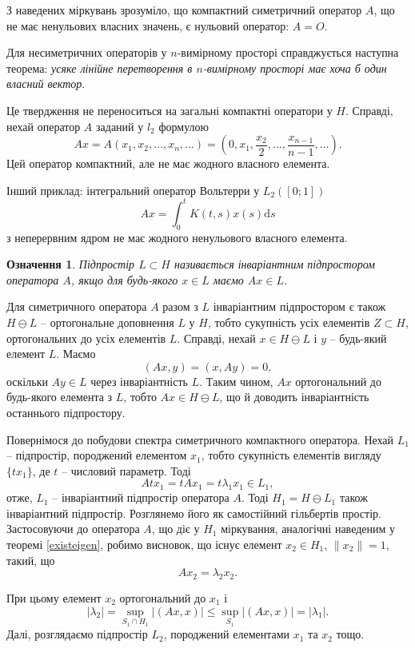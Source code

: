\documentclass[14pt,twoside]{extreport}
\theoremstyle{mystyle}
\newtheorem{dfn}{Означення}
\numberwithin{equation}{chapter}
\begin{document}
З наведених міркувань зрозуміло, що компактний симетричний оператор $A$, що не має ненульових власних значень, є нульовий оператор: $A = O$.

Для несиметричних операторів у $n$-вимірному просторі справджується наступна теорема: \emph{усяке лінійне перетворення в $n$-вимірному просторі має хоча б один власний вектор}.

Це твердження не переноситься на загальні компактні оператори у $H$. Справді, нехай оператор $A$ заданий у $l_2$ формулою
\[
 Ax=A(x_1, x_2, \ldots, x_n, \ldots) = \left(0, x_1, \frac{x_2}{2}, \dots, \frac{x_{n-1}}{n-1}, \dots\right).
\]
Цей оператор компактний, але не має жодного власного елемента.

Інший приклад: інтегральний оператор Вольтерри у $L_2([0; 1])$
\[
 Ax=\int_{0}^{t} K(t, s) x(s) \mathrm{d}s
\]
з неперервним ядром не має жодного ненульового власного елемента.

\begin{dfn}
Підпростір $L \subset H$ називається інваріантним підпростором оператора $A$, якщо для будь-якого $x \in L$ маємо $Ax \in L$.
\end{dfn}

Для симетричного оператора $A$ разом з $L$ інваріантним підпростором є також $H \ominus L$ -- ортогональне доповнення $L$ у $H$, тобто сукупність усіх елементів $Z \subset H$, ортогональних до усіх елементів $L$. Справді, нехай $x \in H \ominus L$ і $y$ -- будь-який елемент $L$. Маємо
\[
 (Ax, y) = (x, Ay) = 0,
\]
оскільки $Ay \in L$ через інваріантність $L$. Таким чином, $Ax$ ортогональний до будь-якого елемента з $L$, тобто $Ax \in H \ominus L$, що й доводить інваріантність останнього підпростору.

Повернімося до побудови спектра симетричного компактного оператора. Нехай $L_1$ -- підпростір, породжений елементом $x_1$, тобто сукупність елементів вигляду $\{tx_1\}$, де $t$ -- числовий параметр. Тоді
\[
 Atx_1 = tAx_1 = t\lambda_1 x_1 \in L_1,
\]
отже, $L_1$ -- інваріантний підпростір оператора $A$. Тоді $H_1 = H \ominus L_1$ також інваріантний підпростір. Розглянемо його як самостійний гільбертів простір. Застосовуючи до оператора $A$, що діє у $H_1$ міркування, аналогічні наведеним у теоремі \ref{existeigen}, робимо висновок, що існує елемент $x_2 \in H_1$, $\|x_2\| =1$, такий, що
\[
 Ax_2 = \lambda_2 x_2.
\]

При цьому елемент $x_2$ ортогональний до $x_1$ і
\[
 |\lambda_2| = \sup\limits_{S_1\cap H_1} |(Ax, x)| \leqslant \sup\limits_{S_1} |(Ax, x)| = |\lambda_1|.
\]
Далі, розглядаємо підпростір $L_2$, породжений елементами $x_1$ та $x_2$ тощо.
\end{document}
